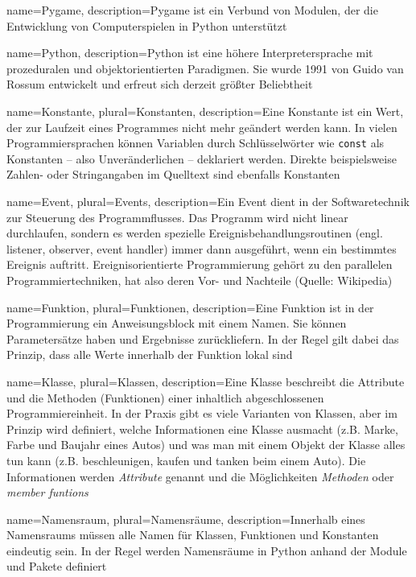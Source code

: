 {
  name={Pygame},
  description={Pygame ist ein Verbund von Modulen, der die Entwicklung von Computerspielen in Python unterstützt}
}

{
  name={Python},
  description={Python ist eine höhere Interpretersprache mit prozeduralen und objektorientierten Paradigmen. Sie wurde 1991 von Guido van Rossum entwickelt und erfreut sich derzeit größter Beliebtheit}
}

{
  name={Konstante},
  plural={Konstanten},
  description={Eine Konstante ist ein Wert, der zur Laufzeit eines Programmes nicht mehr geändert werden kann. In vielen Programmiersprachen können Variablen durch Schlüsselwörter wie \texttt{const} als Konstanten -- also Unveränderlichen -- deklariert werden. Direkte beispielsweise Zahlen- oder Stringangaben im Quelltext sind ebenfalls Konstanten}
}

{
  name={Event},
  plural={Events},
  description={Ein Event dient in der Softwaretechnik zur Steuerung des Programmflusses. Das Programm wird nicht linear durchlaufen, sondern es werden spezielle Ereignisbehandlungsroutinen (engl. listener, observer, event handler) immer dann ausgeführt, wenn ein bestimmtes Ereignis auftritt. Ereignisorientierte Programmierung gehört zu den parallelen Programmiertechniken, hat also deren Vor- und Nachteile (Quelle: Wikipedia)}
}

{
  name={Funktion},
  plural={Funktionen},
  description={Eine Funktion ist in der Programmierung ein Anweisungsblock mit einem Namen. Sie können Parametersätze haben und Ergebnisse zurückliefern. In der Regel gilt dabei das Prinzip, dass alle Werte innerhalb der Funktion lokal sind}
}

{
  name={Klasse},
  plural={Klassen},
  description={Eine Klasse beschreibt die Attribute und die Methoden (Funktionen) einer inhaltlich abgeschlossenen Programmiereinheit. In der Praxis gibt es viele Varianten von Klassen, aber im Prinzip wird definiert, welche Informationen eine Klasse ausmacht (z.B. Marke, Farbe und Baujahr eines Autos) und was man mit einem Objekt der Klasse alles tun kann (z.B. beschleunigen, kaufen und tanken beim einem Auto). Die Informationen werden \emph{Attribute} genannt und die Möglichkeiten \emph{Methoden} oder \emph{member funtions}} 
}

{
  name={Namensraum},
  plural={Namensräume},
  description={Innerhalb eines Namensraums müssen alle Namen für Klassen, Funktionen und Konstanten eindeutig sein. In der Regel werden Namensräume in Python anhand der Module und Pakete definiert} 
}

